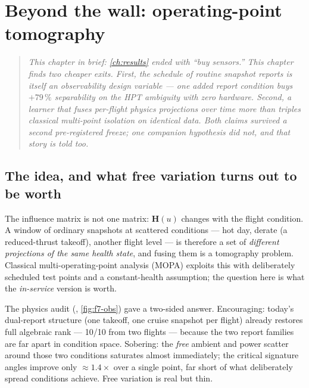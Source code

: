 \chapter{Beyond the wall: operating-point tomography}
\label{ch:tomography}

\begin{quote}\itshape
This chapter in brief: \cref{ch:results} ended with ``buy sensors.'' This chapter finds two cheaper
exits. First, the \emph{schedule} of routine snapshot reports is itself an observability
design variable --- one added report condition buys $+79\,\%$ separability on the HPT
ambiguity with zero hardware. Second, a learner that fuses per-flight \emph{physics
projections} over time more than triples classical multi-point isolation on identical data.
Both claims survived a second pre-registered freeze; one companion hypothesis did not, and
that story is told too.
\end{quote}



\section{The idea, and what free variation turns out to be worth}
\label{sec:tomo-idea}

The influence matrix is not one matrix: $\mathbf{H}(u)$ changes with the flight condition.
A window of ordinary snapshots at scattered conditions --- hot day, derate (a
reduced-thrust takeoff), another flight level --- is therefore a set of \emph{different
projections of the same health state}, and
fusing them is a tomography problem. Classical multi-operating-point analysis (MOPA) exploits this
with deliberately scheduled test points and a constant-health assumption; the question here
is what the \emph{in-service} version is worth.

The physics audit (, \cref{fig:f7-obs}) gave a two-sided
answer. Encouraging: today's dual-report structure (one takeoff, one cruise snapshot per
flight) already restores full algebraic rank --- 10/10 from two flights --- because the two
report families are far apart in condition space. Sobering: the \emph{free} ambient and
power scatter around those two conditions saturates almost immediately; the critical
signature angles improve only $\approx 1.4\times$ over a single point, far short of what
deliberately spread conditions achieve. Free variation is real but thin.

